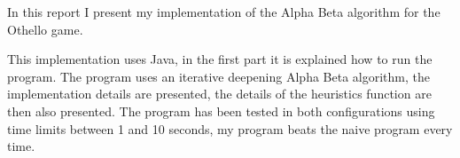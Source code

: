 In this report I present my implementation of the Alpha Beta algorithm for the Othello game.

This implementation uses Java, in the first part it is explained how to run the program.
The program uses an iterative deepening Alpha Beta algorithm, the implementation details are presented, the details of the heuristics function are then also presented.
The program has been tested in both configurations using time limits between 1 and 10 seconds, my program beats the naive program every time.
